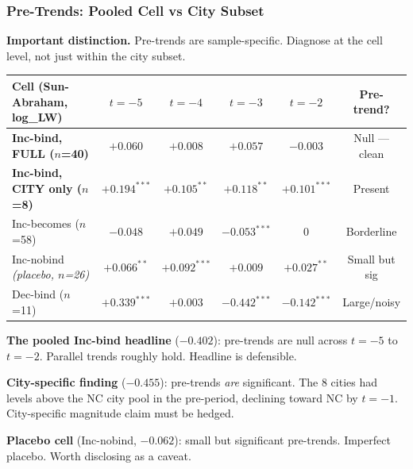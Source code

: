 \documentclass[xcolor = x11names, compress, aspectratio = 169]{beamer}
\begin{document}
    \begin{frame}
    \frametitle{Pre-Trends: Pooled Cell vs City Subset}
        \footnotesize
        \textbf{Important distinction.} Pre-trends are sample-specific.
        Diagnose at the cell level, not just within the city subset.
        \medskip
        \scriptsize
        \renewcommand{\arraystretch}{1.15}
        \setlength{\tabcolsep}{8pt}
        \begin{tabular}{lcccc|c}
            \toprule
            Cell (Sun-Abraham, log\_LW) & $t=-5$ & $t=-4$ & $t=-3$ & $t=-2$ & Pre-trend? \\
            \midrule
            \textbf{Inc-bind, FULL ($n$=40)} & $+0.060$  & $+0.008$  & $+0.057$  & $-0.003$  & \alert{Null --- clean} \\
            \textbf{Inc-bind, CITY only ($n$=8)} & $\bm{+0.194^{***}}$ & $\bm{+0.105^{**}}$ & $\bm{+0.118^{**}}$ & $\bm{+0.101^{***}}$ & \alert{Present} \\
            Inc-becomes ($n$=58)        & $-0.048$  & $+0.049$  & $-0.053^{***}$ & $0$       & Borderline \\
            Inc-nobind \emph{(placebo, $n$=26)} & $+0.066^{**}$ & $+0.092^{***}$ & $+0.009$ & $+0.027^{**}$ & Small but sig \\
            Dec-bind ($n$=11)           & $+0.339^{***}$ & $+0.003$ & $-0.442^{***}$ & $-0.142^{***}$ & Large/noisy \\
            \bottomrule
        \end{tabular}
        \medskip

        \textbf{The pooled Inc-bind headline} ($-0.402$): pre-trends are null
        across $t=-5$ to $t=-2$. Parallel trends roughly hold. Headline is
        defensible.
        \medskip

        \textbf{City-specific finding} ($-0.455$): pre-trends \emph{are}
        significant. The 8 cities had levels above the NC city pool in the
        pre-period, declining toward NC by $t=-1$. City-specific magnitude
        claim must be hedged.
        \medskip

        \textbf{Placebo cell} (Inc-nobind, $-0.062$): small but significant
        pre-trends. Imperfect placebo. Worth disclosing as a caveat.
    \end{frame}
\end{document}
